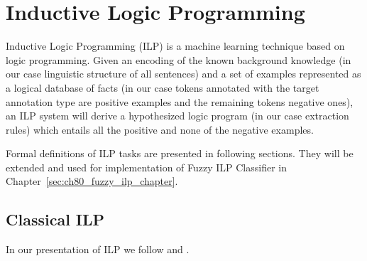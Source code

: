 \section{Inductive Logic Programming} \label{sec:ch30_ILP}

Inductive Logic Programming (ILP) \citep{biblio:MuggletonILP} is a machine learning technique based on logic programming. Given an encoding of the known background knowledge (in our case linguistic structure of all sentences) and a set of examples represented as a logical database of facts (in our case tokens annotated with the target annotation type are positive examples and the remaining tokens negative ones), an ILP system will derive a hypothesized logic program (in our case extraction rules) which entails all the positive and none of the negative examples.

Formal definitions of ILP tasks are presented in following sections. They will be extended and used for implementation of Fuzzy ILP Classifier in Chapter~\ref{sec:ch80_fuzzy_ilp_chapter}.







\subsection{Classical ILP} \label{sec:ch30_ILP_classic}

In our presentation of ILP we follow \cite{dzeroski2001:relat_dm} and  \cite{biblio:Muggleton94inductivelogic}.


\theoremstyle{definition}
\newtheorem{definition}{Definition}
\newtheorem{theorem}{Theorem}


